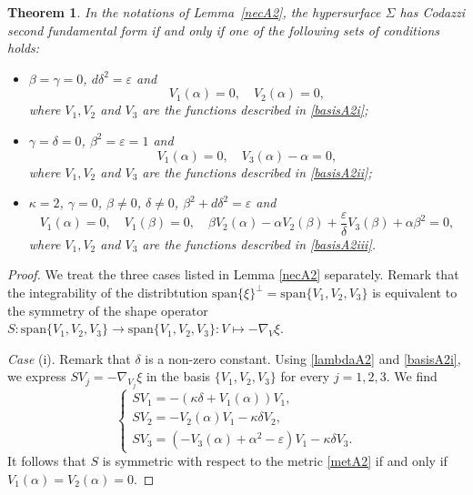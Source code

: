 \documentclass{amsart}
\theoremstyle{plain}
\newtheorem{theorem}{Theorem}
\theoremstyle{remark}
\begin{document}
{\begin{theorem}\label{codA2}
In the notations of Lemma~{\rm\ref{necA2}}, the hypersurface $\Sigma$ has Codazzi second fundamental form if and only if one of the following sets of conditions holds: 
%
\begin{itemize}
\item[(i)] $\beta=\gamma=0$, $d\delta^2 = \varepsilon$ and 
\[
V_1(\alpha) = 0, \quad V_2(\alpha)=0,
\]
where $V_1,V_2$ and $V_3$ are the functions described in \eqref{basisA2i};  
\vspace{1mm}\item[(ii)] $\gamma=\delta=0$, $\beta^2 = \varepsilon =1$ and 
\[
V_1(\alpha)=0, \quad V_3(\alpha)-\alpha=0,
\]
where $V_1,V_2$ and $V_3$ are the functions described in \eqref{basisA2ii};
\vspace{1mm}\item[(iii)] $\kappa = 2$, $\gamma =0$, $\beta\neq 0$, $\delta\neq 0$, $\beta^2 + d\delta^2 = \varepsilon$ and 
\[
V_1(\alpha) = 0, \quad V_1(\beta) = 0, \quad \beta V_2(\alpha) - \alpha V_2(\beta) + \frac{\varepsilon}{\delta}V_3(\beta) + \alpha\beta^2 =0, 
\]
where $V_1,V_2$ and $V_3$ are the functions described in \eqref{basisA2iii}.
\end{itemize}
\end{theorem}
\begin{proof}
We treat the three cases listed in Lemma \ref{necA2} separately. Remark that the integrability of the distribtution $\mathrm{span}\{\xi\}^{\perp}=\mathrm{span}\{V_1,V_2,V_3\}$ is equivalent to the symmetry of the shape operator $S: \mathrm{span}\{V_1,V_2,V_3\} \to \mathrm{span}\{V_1,V_2,V_3\} : V \mapsto -\nabla_V\xi$.

\smallskip
{\em Case} (i). Remark that $\delta$ is a non-zero constant. Using \eqref{lambdaA2} and \eqref{basisA2i}, we express $SV_j=-\nabla_{V_j}\xi$ in the basis $\{V_1,V_2,V_3\}$ for every $j=1,2,3$. We find
\begin{equation}\label{sA2i}
\left\{
\begin{array}{l}
SV_1 =   -(\kappa\delta + V_1(\alpha))V_1, \\[4 pt]
SV_2 = - V_2(\alpha) V_1   -  \kappa \delta V_2, \\[4 pt]
SV_3 =  \left(-V_3(\alpha) + \alpha^2-\varepsilon \right) V_1 -\kappa\delta V_3.
\end{array}
\right.
\end{equation}
It follows that $S$ is symmetric with respect to the metric \eqref{metA2} if and only if $V_1(\alpha)=V_2(\alpha)=0$. 


\end{proof}}
\end{document}
